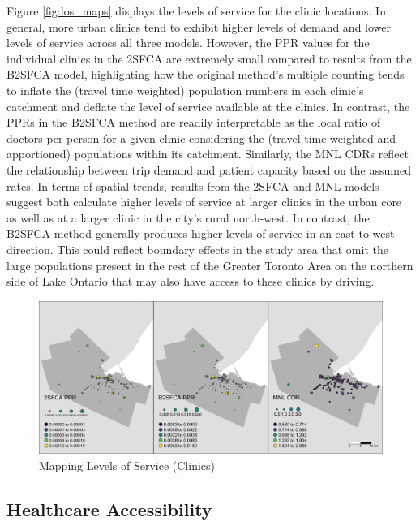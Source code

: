 \documentclass[]{elsarticle} %
\begin{document}
Figure \ref{fig:los_maps} displays the levels of service for the clinic
locations. In general, more urban clinics tend to exhibit higher levels
of demand and lower levels of service across all three models. However,
the PPR values for the individual clinics in the 2SFCA are extremely
small compared to results from the B2SFCA model, highlighting how the
original method's multiple counting tends to inflate the (travel time
weighted) population numbers in each clinic's catchment and deflate the
level of service available at the clinics. In contrast, the PPRs in the
B2SFCA method are readily interpretable as the local ratio of doctors
per person for a given clinic considering the (travel-time weighted and
apportioned) populations within its catchment. Similarly, the MNL CDRs
reflect the relationship between trip demand and patient capacity based
on the assumed rates. In terms of spatial trends, results from the 2SFCA
and MNL models suggest both calculate higher levels of service at larger
clinics in the urban core as well as at a larger clinic in the city's
rural north-west. In contrast, the B2SFCA method generally produces
higher levels of service in an east-to-west direction. This could
reflect boundary effects in the study area that omit the large
populations present in the rest of the Greater Toronto Area on the
northern side of Lake Ontario that may also have access to these clinics
by driving.

\begin{figure}
\includegraphics[width=1\linewidth]{./img/los_maps} \caption{\label{fig:los_maps}Mapping Levels of Service (Clinics)}\label{fig:fig 3 los_maps_fig}
\end{figure}

\hypertarget{healthcare-accessibility}{%
\subsection{Healthcare Accessibility}\label{healthcare-accessibility}}
\end{document}
